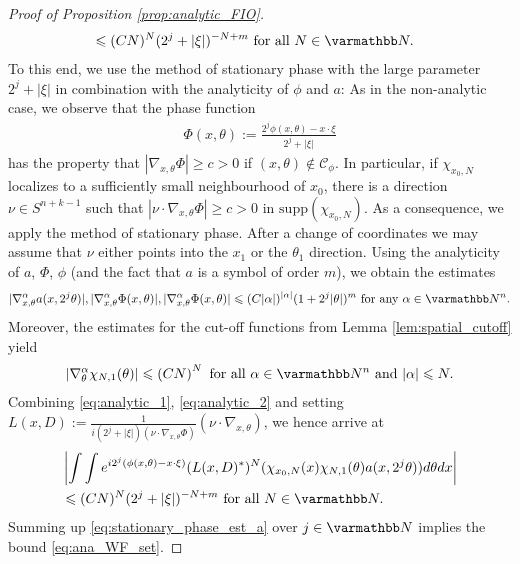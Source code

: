 \documentclass[12pt,twoside]{amsart}
\numberwithin{equation}{section}
\renewcommand{\leq}{\leqslant}
\renewcommand{\geq}{\geqslant}
\newcommand{\supp}{\mathrm{supp}}
\begin{document}
\begin{appendix}
\begin{proof}[Proof of Proposition \ref{prop:analytic_FIO}]
\begin{align}
\begin{split}
&\leq (CN)^N (2^{j} + |\xi|)^{-N+m} \mbox{ for all } N \in \N.
\end{split}
\end{align}
To this end, we use the method of stationary phase with the large parameter $2^j +|\xi|$ in combination with the  analyticity of $\phi$ and $a$: As in the non-analytic case, we observe that the phase function 
\begin{align*}
\Phi(x,\theta):= \frac{2^j\phi(x,\theta)-x \cdot \xi}{2^{j} + |\xi|}
\end{align*}
has the property that $|\nabla_{x,\theta}\Phi|\geq c >0$ if $(x,\theta) \notin \mathcal{C}_{\phi}$. In particular, if $\chi_{x_0,N}$ localizes to a sufficiently small neighbourhood of $x_0$, there is a direction $\nu \in S^{n+k-1}$ such that $|\nu\cdot \nabla_{x,\theta}\Phi | \geq c >0$ in $\supp(\chi_{x_0,N})$. As a consequence, we apply the method of stationary phase. After a change of coordinates we may assume that $\nu$ either points into the $x_1$ or the $\theta_1$ direction. Using the analyticity of $a$, $\Phi$, $\phi$ (and the fact that $a$ is a symbol of order $m$), we obtain the estimates
\begin{align}
\label{eq:analytic_1}
\begin{split}
|\nabla^{\alpha}_{x,\theta} a(x,2^j\theta)|, |\nabla^{\alpha}_{x,\theta} \Phi(x,\theta)|,
|\nabla^{\alpha}_{x,\theta}\Phi(x,\theta)| \leq (C|\alpha|)^{|\alpha|}(1+2^j|\theta|)^m \mbox{ for any } \alpha \in \N^n.
\end{split}
\end{align}
Moreover, the estimates for the cut-off functions from Lemma \ref{lem:spatial_cutoff} yield
\begin{align}
\label{eq:analytic_2}
|\nabla^{\alpha}_{\theta} \chi_{N,1}(\theta)| \leq \left(CN \right)^{N} \mbox{ for all } \alpha \in \N^n \mbox{ and }  |\alpha| \leq N.
\end{align} 
Combining \eqref{eq:analytic_1}, \eqref{eq:analytic_2} and setting $L(x,D) := \frac{1}{i (2^j+|\xi|) (\nu\cdot \nabla_{x,\theta} \Phi) } (\nu \cdot \nabla_{x,\theta} )$, we hence arrive at 
\begin{align}
\label{eq:stationary_phase_est_a}
\begin{split}
&\left| \int\int e^{i 2^j(\phi(x,\theta)-x\cdot \xi)} (L(x,D)^{\ast})^{N}(\chi_{x_0,N}(x) \chi_{N,1}(\theta) a(x, 2^j\theta)) d\theta dx \right|\\
&\leq (CN)^N (2^j + |\xi|)^{-N+m} \mbox{ for all } N \in \N.
\end{split}
\end{align}
Summing up \eqref{eq:stationary_phase_est_a} over $j\in \N$  implies the bound \eqref{eq:ana_WF_set}.
\end{proof}


\end{appendix}
\end{document}
